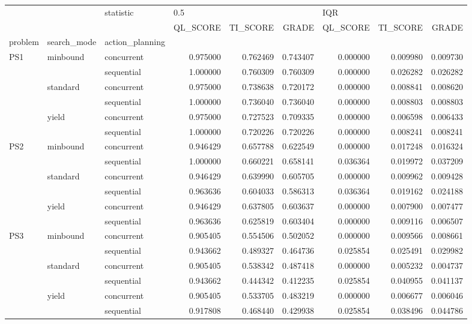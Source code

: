 \begin{tabular}{lllrrrrrr}
\toprule
    &       & statistic & \multicolumn{3}{l}{0.5} & \multicolumn{3}{l}{IQR} \\
    &       & {} &  QL\_SCORE &  TI\_SCORE &     GRADE &  QL\_SCORE &  TI\_SCORE &     GRADE \\
problem & search\_mode & action\_planning &           &           &           &           &           &           \\
\midrule
PS1 & minbound & concurrent &  0.975000 &  0.762469 &  0.743407 &  0.000000 &  0.009980 &  0.009730 \\
    &       & sequential &  1.000000 &  0.760309 &  0.760309 &  0.000000 &  0.026282 &  0.026282 \\
    & standard & concurrent &  0.975000 &  0.738638 &  0.720172 &  0.000000 &  0.008841 &  0.008620 \\
    &       & sequential &  1.000000 &  0.736040 &  0.736040 &  0.000000 &  0.008803 &  0.008803 \\
    & yield & concurrent &  0.975000 &  0.727523 &  0.709335 &  0.000000 &  0.006598 &  0.006433 \\
    &       & sequential &  1.000000 &  0.720226 &  0.720226 &  0.000000 &  0.008241 &  0.008241 \\
PS2 & minbound & concurrent &  0.946429 &  0.657788 &  0.622549 &  0.000000 &  0.017248 &  0.016324 \\
    &       & sequential &  1.000000 &  0.660221 &  0.658141 &  0.036364 &  0.019972 &  0.037209 \\
    & standard & concurrent &  0.946429 &  0.639990 &  0.605705 &  0.000000 &  0.009962 &  0.009428 \\
    &       & sequential &  0.963636 &  0.604033 &  0.586313 &  0.036364 &  0.019162 &  0.024188 \\
    & yield & concurrent &  0.946429 &  0.637805 &  0.603637 &  0.000000 &  0.007900 &  0.007477 \\
    &       & sequential &  0.963636 &  0.625819 &  0.603404 &  0.000000 &  0.009116 &  0.006507 \\
PS3 & minbound & concurrent &  0.905405 &  0.554506 &  0.502052 &  0.000000 &  0.009566 &  0.008661 \\
    &       & sequential &  0.943662 &  0.489327 &  0.464736 &  0.025854 &  0.025491 &  0.029982 \\
    & standard & concurrent &  0.905405 &  0.538342 &  0.487418 &  0.000000 &  0.005232 &  0.004737 \\
    &       & sequential &  0.943662 &  0.444342 &  0.412235 &  0.025854 &  0.040955 &  0.041137 \\
    & yield & concurrent &  0.905405 &  0.533705 &  0.483219 &  0.000000 &  0.006677 &  0.006046 \\
    &       & sequential &  0.917808 &  0.468440 &  0.429938 &  0.025854 &  0.038496 &  0.044786 \\
\bottomrule
\end{tabular}

